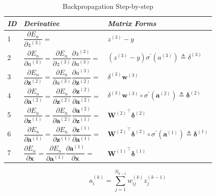 \documentclass{article}
\begin{document}
\begin{table}[h]
\centering
\caption{Backpropagation Step-by-step}
\begin{tabular}{lll}
\toprule
\emph{ID} & \emph{Derivative} & \emph{Matrix Forms} \\
\midrule
1 & $\dfrac{\partial E_n}{\partial z^{(3)}} =$ & $z^{(3)} - y$ \\[4ex]

2 & $\dfrac{\partial E_n}{\partial a^{(3)}} = \dfrac{\partial E_n}{\partial z^{(3)}} \dfrac{\partial z^{(3)}}{\partial a^{(3)}}=$ & $(z^{(3)} - y) \sigma^{'}(a^{(3)}) \triangleq \delta^{(3)}$  \\[4ex]

3 & $\dfrac{\partial E_n}{\partial \mathbf{z}^{(2)}} = \dfrac{\partial E_n}{\partial a^{(3)}} \dfrac{\partial a^{(3)}}{\partial \mathbf{z}^{(2)}} =$ & $ \delta^{(3)} \mathbf{w}^{(3)}$  \\[4ex]

4 & $\dfrac{\partial E_n}{\partial \mathbf{a}^{(2)}} = \dfrac{\partial E_n}{\partial \mathbf{z}^{(2)}} \dfrac{\partial \mathbf{z}^{(2)}}{\partial \mathbf{a}^{(2)}} =$ & $ \delta^{(3)} \mathbf{w}^{(3)} \circ \sigma^{'}(\mathbf{a}^{(2)}) \triangleq \bm{\delta}^{(2)}$  \\[4ex]

5 & $\dfrac{\partial E_n}{\partial \mathbf{z}^{(1)}} = \dfrac{\partial E_n}{\partial \mathbf{a}^{(2)}} \dfrac{\partial \mathbf{a}^{(2)}}{\partial \mathbf{z}^{(1)}}=$ & $ {\mathbf{W}^{(2)}}^{\top} \bm{\delta}^{(2)}$  \\[4ex]

6 &  $\dfrac{\partial E_n}{\partial \mathbf{a}^{(1)}} = \dfrac{\partial E_n}{\partial \mathbf{z}^{(1)}} \dfrac{\partial \mathbf{z}^{(1)}}{\partial \mathbf{a}^{(1)}} =$ & $ {\mathbf{W}^{(2)}}^{\top} \bm{\delta}^{(2)} \circ \sigma^{'}(\mathbf{a}^{(1)}) \triangleq \bm{\delta}^{(1)}$ \\[4ex]

7 & $\dfrac{\partial E_n}{\partial \mathbf{x}} =\dfrac{\partial E_n}{\partial \mathbf{a}^{(1)}} \dfrac{\partial \mathbf{a}^{(1)}}{\partial \mathbf{x}}=$ & $ {\mathbf{W}^{(1)}}^{\top} \bm{\delta}^{(1)}$ \\[4ex]

\bottomrule
\end{tabular}
\end{table}


\begin{equation}
    a_i^{(k)} = \sum_{j=1}^{N_{k-1}} w_{ij}^{(k)} z_j^{(k-1)} 
\end{equation}
\end{document}
